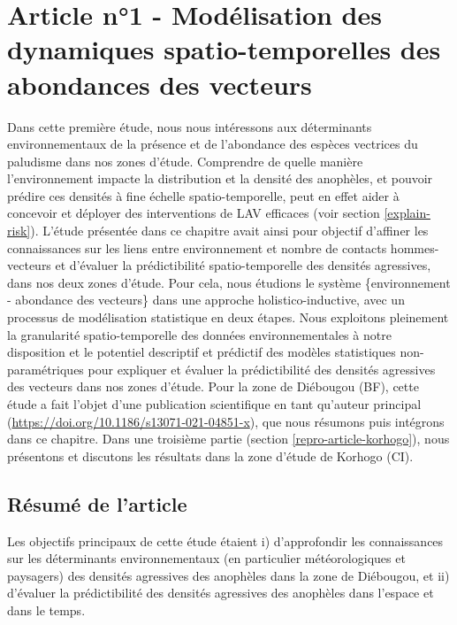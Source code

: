 \documentclass[12pt,twoside]{reedthesis}
\begin{document}
\hypertarget{data-mining-abundances}{%
\chapter{Article n°1 - Modélisation des dynamiques spatio-temporelles des abondances des vecteurs}\label{data-mining-abundances}}

Dans cette première étude, nous nous intéressons aux déterminants environnementaux de la présence et de l'abondance des espèces vectrices du paludisme dans nos zones d'étude. Comprendre de quelle manière l'environnement impacte la distribution et la densité des anophèles, et pouvoir prédire ces densités à fine échelle spatio-temporelle, peut en effet aider à concevoir et déployer des interventions de LAV efficaces (voir section \ref{explain-risk}). L'étude présentée dans ce chapitre avait ainsi pour objectif d'affiner les connaissances sur les liens entre environnement et nombre de contacts hommes-vecteurs et d'évaluer la prédictibilité spatio-temporelle des densités agressives, dans nos deux zones d'étude. Pour cela, nous étudions le système \{environnement - abondance des vecteurs\} dans une approche holistico-inductive, avec un processus de modélisation statistique en deux étapes. Nous exploitons pleinement la granularité spatio-temporelle des données environnementales à notre disposition et le potentiel descriptif et prédictif des modèles statistiques non-paramétriques pour expliquer et évaluer la prédictibilité des densités agressives des vecteurs dans nos zones d'étude. Pour la zone de Diébougou (BF), cette étude a fait l'objet d'une publication scientifique en tant qu'auteur principal (\url{https://doi.org/10.1186/s13071-021-04851-x}), que nous résumons puis intégrons dans ce chapitre. Dans une troisième partie (section \ref{repro-article-korhogo}), nous présentons et discutons les résultats dans la zone d'étude de Korhogo (CI).\\

\hypertarget{summary-article-2}{%
\section{Résumé de l'article}\label{summary-article-2}}

Les objectifs principaux de cette étude étaient i) d'approfondir les connaissances sur les déterminants environnementaux (en particulier météorologiques et paysagers) des densités agressives des anophèles dans la zone de Diébougou, et ii) d'évaluer la prédictibilité des densités agressives des anophèles dans l'espace et dans le temps.\\
\end{document}
